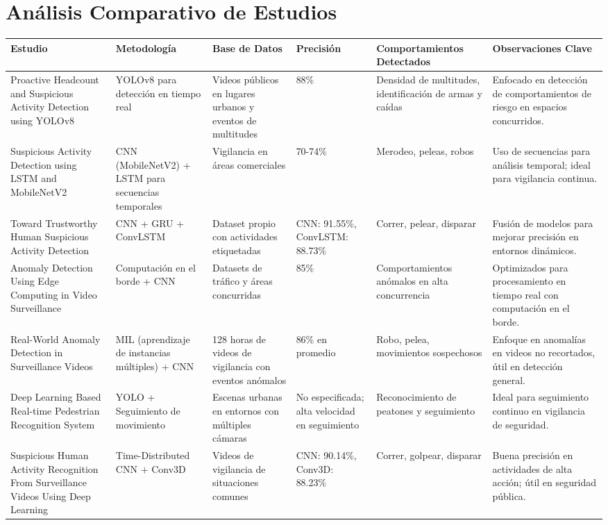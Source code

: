 \documentclass[listof=nochaptergap,12pt,times,authoryear]{report}
\begin{document}
\chapter{Análisis Comparativo de Estudios}
\begin{landscape}
\begin{longtable}{|p{5cm}|p{4cm}|p{3cm}|p{2cm}|p{3cm}|p{5cm}|}
    \hline
    \textbf{Estudio} & \textbf{Metodología} & \textbf{Base de Datos} & \textbf{Precisión} & \textbf{Comportamientos Detectados} & \textbf{Observaciones Clave} \\ \hline
    Proactive Headcount and Suspicious Activity Detection using YOLOv8 & YOLOv8 para detección en tiempo real & Videos públicos en lugares urbanos y eventos de multitudes & 88\% & Densidad de multitudes, identificación de armas y caídas & Enfocado en detección de comportamientos de riesgo en espacios concurridos. \\ \hline
    Suspicious Activity Detection using LSTM and MobileNetV2 & CNN (MobileNetV2) + LSTM para secuencias temporales & Vigilancia en áreas comerciales & 70-74\% & Merodeo, peleas, robos & Uso de secuencias para análisis temporal; ideal para vigilancia continua. \\ \hline
    Toward Trustworthy Human Suspicious Activity Detection & CNN + GRU + ConvLSTM & Dataset propio con actividades etiquetadas & CNN: 91.55\%, ConvLSTM: 88.73\% & Correr, pelear, disparar & Fusión de modelos para mejorar precisión en entornos dinámicos. \\ \hline
    Anomaly Detection Using Edge Computing in Video Surveillance & Computación en el borde + CNN & Datasets de tráfico y áreas concurridas & 85\% & Comportamientos anómalos en alta concurrencia & Optimizados para procesamiento en tiempo real con computación en el borde. \\ \hline
    Real-World Anomaly Detection in Surveillance Videos & MIL (aprendizaje de instancias múltiples) + CNN & 128 horas de videos de vigilancia con eventos anómalos & 86\% en promedio & Robo, pelea, movimientos sospechosos & Enfoque en anomalías en videos no recortados, útil en detección general. \\ \hline
    Deep Learning Based Real-time Pedestrian Recognition System & YOLO + Seguimiento de movimiento & Escenas urbanas en entornos con múltiples cámaras & No especificada; alta velocidad en seguimiento & Reconocimiento de peatones y seguimiento & Ideal para seguimiento continuo en vigilancia de seguridad. \\ \hline
    Suspicious Human Activity Recognition From Surveillance Videos Using Deep Learning & Time-Distributed CNN + Conv3D & Videos de vigilancia de situaciones comunes & CNN: 90.14\%, Conv3D: 88.23\% & Correr, golpear, disparar & Buena precisión en actividades de alta acción; útil en seguridad pública. \\ \hline

\end{longtable}
\end{landscape}
\end{document}
